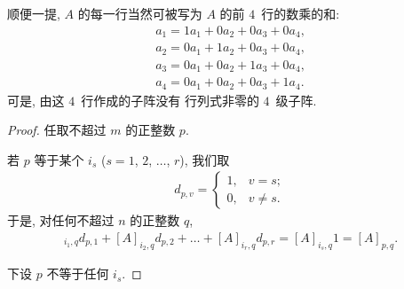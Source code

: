 \begin{example}
    顺便一提,
    \(A\) 的每一行当然可被写为
    \(A\) 的前 \(4\)~行的数乘的和:
    \begin{align*}
        a_1 = 1a_1 + 0a_2 + 0a_3 + 0a_4, \\
        a_2 = 0a_1 + 1a_2 + 0a_3 + 0a_4, \\
        a_3 = 0a_1 + 0a_2 + 1a_3 + 0a_4, \\
        a_4 = 0a_1 + 0a_2 + 0a_3 + 1a_4.
    \end{align*}
    可是, 由这 \(4\)~行作成的子阵没有%
    行列式非零的 \(4\)~级子阵.
\end{example}

\begin{proof}
    任取不超过 \(m\) 的正整数 \(p\).

    若 \(p\) 等于某个 \(i_s\)
    (\(s = 1\), \(2\), \(\dots\), \(r\)),
    我们取
    \begin{align*}
        d_{p,v}
        = \begin{cases}
              1, & v = s;    \\
              0, & v \neq s.
          \end{cases}
    \end{align*}
    于是, 对任何不超过 \(n\) 的正整数 \(q\),
    \begin{align*}
        [A]_{i_1,q} d_{p,1}
        + [A]_{i_2,q} d_{p,2}
        + \dots
        + [A]_{i_r,q} d_{p,r}
            = [A]_{i_s,q} 1
            = [A]_{p,q}.
    \end{align*}

    下设 \(p\) 不等于任何 \(i_s\).


\end{proof}
